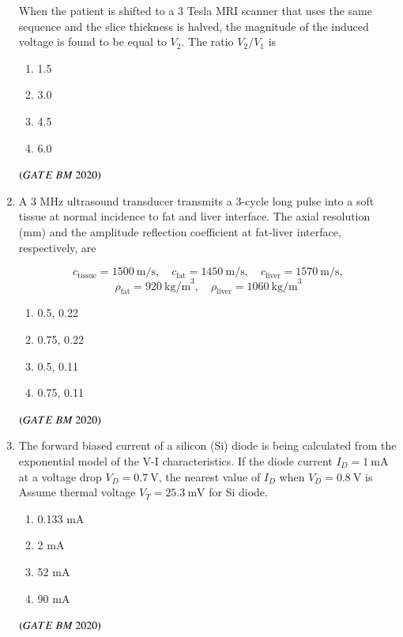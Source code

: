 \documentclass[journal,12pt,onecolumn]{IEEEtran}
\theoremstyle{remark}
\begin{document}
\begin{enumerate}
When the patient is shifted to a 3 Tesla MRI scanner that uses the same sequence 
and the slice thickness is halved, the magnitude of the induced voltage is found 
to be equal to $V_2$. The ratio $V_2/V_1$ is
\begin{enumerate}[label=\alph*)] 
\item\hspace{0.5cm}1.5
\item\hspace{0.5cm}3.0
\item\hspace{0.5cm}4.5
\item\hspace{0.5cm}6.0
\end{enumerate}
 \hfill $\left(GATE\ BM\ 2020\right)$
 
\item A 3 MHz ultrasound transducer transmits a 3-cycle long pulse into a soft tissue at 
normal incidence to fat and liver interface. The axial resolution (mm) and the 
amplitude reflection coefficient at fat-liver interface, respectively, are

\[
c_{\text{tissue}} = 1500 \ \text{m/s}, \quad 
c_{\text{fat}} = 1450 \ \text{m/s}, \quad 
c_{\text{liver}} = 1570 \ \text{m/s},
\]
\[
\rho_{\text{fat}} = 920 \ \text{kg/m}^3, \quad 
\rho_{\text{liver}} = 1060 \ \text{kg/m}^3
\]

\begin{enumerate}[label=\alph*)] 
\item\hspace{0.5cm}0.5, 0.22
\item\hspace{0.5cm}0.75, 0.22
\item\hspace{0.5cm}0.5, 0.11
\item\hspace{0.5cm}0.75, 0.11
\end{enumerate}
 \hfill $\left(GATE\ BM\ 2020\right)$
 
\item The forward biased current of a silicon (Si) diode is being calculated from the 
exponential model of the V-I characteristics. If the diode current $I_D = 1 \ \text{mA}$ 
at a voltage drop $V_D = 0.7 \ \text{V}$, the nearest value of $I_D$ when 
$V_D = 0.8 \ \text{V}$ is\\

Assume thermal voltage $V_T = 25.3 \ \text{mV}$ for Si diode.
\begin{enumerate}[label=\alph*)] 
\item\hspace{0.5cm}0.133 mA
\item\hspace{0.5cm}2 mA
\item\hspace{0.5cm}52 mA
\item\hspace{0.5cm}90 mA
\end{enumerate}
 \hfill $\left(GATE\ BM\ 2020\right)$
 

\end{enumerate}
\end{document}
